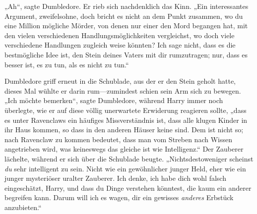 „Ah“, sagte Dumbledore. Er rieb sich nachdenklich das Kinn. „Ein interessantes Argument, zweifelsohne, doch bricht es nicht an dem Punkt zusammen, wo du eine Million mögliche Mörder, von denen nur einer den Mord begangen hat, mit den vielen verschiedenen Handlungsmöglichkeiten vergleichst, wo doch viele verschiedene Handlungen zugleich weise könnten? Ich sage nicht, dass es die bestmögliche Idee ist, den Stein deines Vaters mit dir rumzutragen; nur, dass es besser ist, es zu tun, als es nicht zu tun.“

Dumbledore griff erneut in die Schublade, aus der er den Stein geholt hatte, dieses Mal wühlte er darin rum—zumindest schien sein Arm sich zu bewegen. „Ich möchte bemerken“, sagte Dumbledore, während Harry immer noch überlegte, wie er auf diese völlig unerwartete Erwiderung reagieren sollte, „dass es unter Ravenclaws ein häufiges Missverständnis ist, dass alle klugen Kinder in ihr Haus kommen, so dass in den anderen Häuser keine sind. Dem ist nicht so; nach Ravenclaw zu kommen bedeutet, dass man vom Streben nach Wissen angetrieben wird, was keineswegs das gleiche ist wie Intelligenz.“ Der Zauberer lächelte, während er sich über die Schublade beugte. „Nichtsdestoweniger scheinst \emph{du} sehr intelligent zu sein. Nicht wie ein gewöhnlicher junger Held, eher wie ein junger mysteriöser uralter Zauberer. Ich denke, ich habe dich wohl falsch eingeschätzt, Harry, und dass du Dinge verstehen könntest, die kaum ein anderer begreifen kann. Darum will ich es wagen, dir ein gewisses \emph{anderes} Erbstück anzubieten.“

